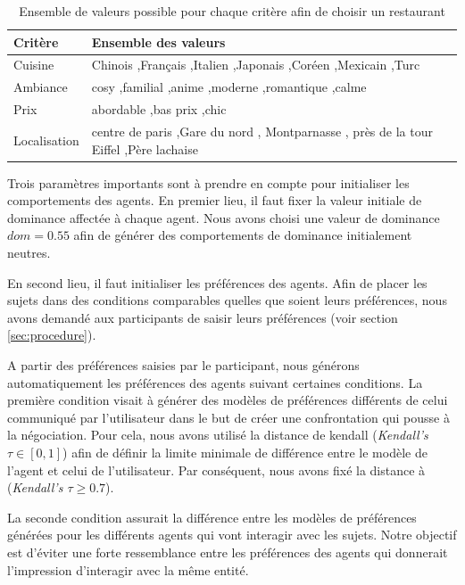 \begin{table}[b]
	\caption{Ensemble de valeurs possible pour chaque critère afin de choisir un restaurant}
	\label{tab:valeursCritere}
	\centering
	\begin{tabular}{ >{\centering\arraybackslash}m{2cm}| >{\centering\arraybackslash}m{9cm}}
		\hline
		\hline
		\textbf{Critère} & \textbf{Ensemble des valeurs} \\
		\hline
		Cuisine & Chinois ,Français ,Italien ,Japonais ,Coréen ,Mexicain ,Turc \\
		\hline
		Ambiance & cosy ,familial ,anime ,moderne ,romantique ,calme \\
		\hline 
		Prix  & abordable ,bas prix ,chic \\
		\hline
		Localisation & centre de paris ,Gare du nord , Montparnasse , près de la tour Eiffel ,Père lachaise \\
		\hline
		\hline
	\end{tabular}
\end{table}

Trois paramètres importants sont à prendre en compte pour initialiser les comportements des agents. 
En premier lieu, il faut fixer la valeur initiale de dominance affectée à chaque agent. Nous avons choisi une valeur de dominance $dom =0.55$ afin de générer des comportements de dominance initialement neutres.

En second lieu, il faut initialiser les préférences des agents. Afin de placer les sujets dans des conditions comparables quelles que soient leurs préférences, nous avons demandé aux participants de saisir leurs préférences (voir section \ref{sec:procedure}).

A partir des préférences saisies par le participant, nous générons automatiquement les préférences des agents suivant certaines conditions.
La première condition visait à générer des modèles de préférences différents de celui communiqué par l'utilisateur dans le but de créer une confrontation qui pousse à la négociation. Pour cela, nous avons utilisé la distance de kendall \cite{bra2013Kendall}  (\emph{Kendall's  $ \tau \in [0,1]$}) afin de définir la limite minimale de différence entre le modèle de l'agent et celui de l'utilisateur. Par conséquent, nous avons fixé la distance à (\emph{Kendall's  $ \tau \geq 0.7$}).

La seconde condition assurait la différence entre les modèles de préférences générées pour les différents agents qui vont interagir avec les sujets. 
Notre objectif est d'éviter une forte ressemblance entre les préférences des agents qui donnerait l'impression d'interagir avec la même entité.

